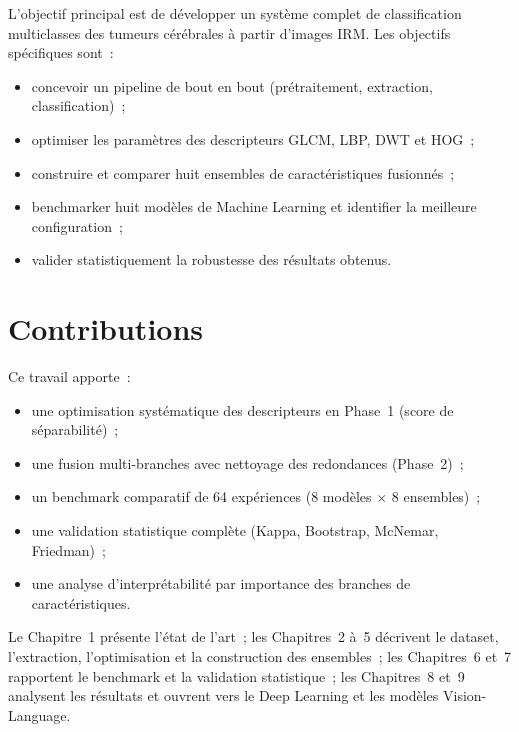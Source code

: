 L'objectif principal est de développer un système complet de classification multiclasses des
tumeurs cérébrales à partir d'images IRM. Les objectifs spécifiques sont~:
\begin{itemize}[leftmargin=1.4em,itemsep=2pt]
  \item concevoir un pipeline de bout en bout (prétraitement, extraction, classification)~;
  \item optimiser les paramètres des descripteurs GLCM, LBP, DWT et HOG~;
  \item construire et comparer huit ensembles de caractéristiques fusionnés~;
  \item benchmarker huit modèles de Machine Learning et identifier la meilleure configuration~;
  \item valider statistiquement la robustesse des résultats obtenus.
\end{itemize}

\section{Contributions}

Ce travail apporte~:
\begin{itemize}[leftmargin=1.4em,itemsep=2pt]
  \item une optimisation systématique des descripteurs en Phase~1 (score de séparabilité)~;
  \item une fusion multi-branches avec nettoyage des redondances (Phase~2)~;
  \item un benchmark comparatif de 64 expériences (8 modèles $\times$ 8 ensembles)~;
  \item une validation statistique complète (Kappa, Bootstrap, McNemar, Friedman)~;
  \item une analyse d'interprétabilité par importance des branches de caractéristiques.
\end{itemize}

Le Chapitre~1 présente l'état de l'art~; les Chapitres~2 à~5 décrivent le dataset, l'extraction,
l'optimisation et la construction des ensembles~; les Chapitres~6 et~7 rapportent le benchmark
et la validation statistique~; les Chapitres~8 et~9 analysent les résultats et ouvrent vers le
Deep Learning et les modèles Vision-Language.
